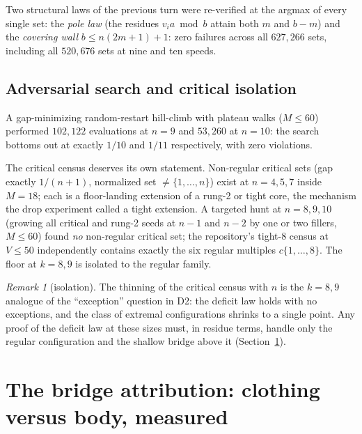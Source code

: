 \documentclass[11pt,a4paper]{article}
\theoremstyle{plain}
\theoremstyle{definition}
\theoremstyle{remark}
\newtheorem{remark}[theorem]{Remark}
\begin{document}
Two structural laws of the previous turn were re-verified at the argmax of every single
set: the \emph{pole law} (the residues $v_i a \bmod b$ attain both $m$ and $b - m$) and
the \emph{covering wall} $b \le n(2m+1) + 1$: zero failures across all $627{,}266$ sets,
including all $520{,}676$ sets at nine and ten speeds.

\subsection{Adversarial search and critical isolation}

A gap-minimizing random-restart hill-climb with plateau walks ($M \le 60$) performed
$102{,}122$ evaluations at $n = 9$ and $53{,}260$ at $n = 10$: the search bottoms out at
exactly $1/10$ and $1/11$ respectively, with zero violations.

The critical census deserves its own statement. Non-regular critical sets (gap exactly
$1/(n+1)$, normalized set $\ne \{1, \dots, n\}$) exist at $n = 4, 5, 7$ inside $M = 18$;
each is a floor-landing extension of a rung-2 or tight core, the mechanism the drop
experiment called a tight extension. A targeted hunt at $n = 8, 9, 10$ (growing all
critical and rung-2 seeds at $n-1$ and $n-2$ by one or two fillers, $M \le 60$) found
\emph{no} non-regular critical set; the repository's tight-8 census at $V \le 50$
independently contains exactly the six regular multiples $c\{1,\dots,8\}$. The floor at
$k = 8, 9$ is isolated to the regular family.

\begin{remark}[isolation]
The thinning of the critical census with $n$ is the $k = 8, 9$ analogue of the
``exception'' question in D2: the deficit law holds with no exceptions, and the class
of extremal configurations shrinks to a single point. Any proof of the deficit law at
these sizes must, in residue terms, handle only the regular configuration and the
shallow bridge above it (Section~\ref{sec:bridge}).
\end{remark}

\section{The bridge attribution: clothing versus body, measured}\label{sec:bridge}
\end{document}
